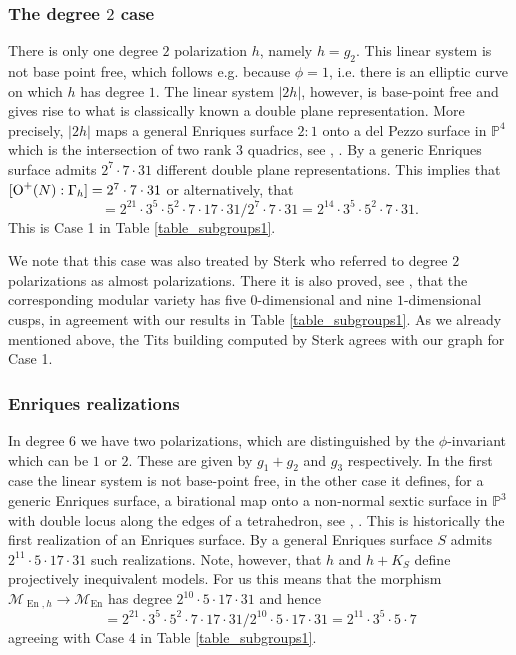 \documentclass[a4paper,11pt]{article}
\newcommand{\PP}{\mathbb P}
\newcommand{\cM}{\mathcal M}
\newcommand{\Orth}{\mathop{\null\mathrm {O}}\nolimits}
\newcommand{\En}{\mathop{\mathrm {En}}\nolimits}
\begin{document}
\subsubsection{The degree $2$ case}
There is only one degree $2$ polarization $h$, namely $h = g_2$. This linear system is not base point free,
which follows e.g. because $\phi=1$, i.e. there is an elliptic curve on which $h$ has degree $1$. The linear system $|2h|$, however, is base-point free
and gives rise to what is classically known a double plane representation. More precisely, $|2h|$ maps a general
Enriques surface $2:1$ onto a del Pezzo surface in $\PP^4$ which is the intersection of two rank $3$ quadrics, see \cite[Section 3.3]{BaPe}, \cite[Section 3.5]{CDL}. By
\cite[Theorem 3.9]{BaPe} a generic Enriques surface admits  $2^7\cdot 7 \cdot 31$ different double plane representations. This implies that $[\Orth^+(N):\Gamma_h]=2^7\cdot 7 \cdot 31$ or alternatively,
that
\begin{equation*}
[\Gamma_h: \tilde\Orth^+(N)]= 2^{21} \cdot 3^5 \cdot 5^2 \cdot 7 \cdot 17 \cdot 31/ 2^7 \cdot 7 \cdot 31= 2^{14} \cdot 3^5 \cdot 5^2 \cdot 7 \cdot 31.
\end{equation*}
This is Case 1 in Table \ref{table_subgroups1}.

We note that this case was also treated by Sterk \cite{Ste} who referred to degree $2$ polarizations as almost polarizations. There it is  also
proved, see \cite[Section 4.4]{Ste}, that the corresponding modular variety has five $0$-dimensional and nine $1$-dimensional cusps, in
agreement with our results in Table \ref{table_subgroups1}. As we already mentioned above, the Tits building computed by Sterk \cite[Fig 14]{Ste} agrees with our graph for Case 1.

\subsubsection{Enriques realizations}

In degree $6$ we have two polarizations, which are distinguished by the $\phi$-invariant which can be $1$ or $2$. These are given by $g_1 + g_2$ and $g_3$ respectively.
In the first case the linear system is not base-point free, in the other case it defines, for a generic Enriques surface, a birational map onto a non-normal sextic surface
in $\PP^3$ with double locus along the edges of a tetrahedron, see \cite[Section 3.1]{BaPe}, \cite[Section 3.5]{CDL}. This is historically the first realization of an Enriques surface.
By \cite[Theorem 3.10]{BaPe} a general Enriques surface $S$
admits $2^{11} \cdot 5 \cdot 17 \cdot 31$ such realizations. Note, however, that $h$ and $h+K_S$ define projectively inequivalent models. For us this means that the morphism
$\cM_{\En,h} \to {\cM}_{\En}$ has degree $2^{10} \cdot 5 \cdot 17 \cdot 31$ and hence
\begin{equation*}
[\Gamma_h: \tilde\Orth^+(N)]= 2^{21} \cdot 3^5 \cdot 5^2 \cdot 7 \cdot 17 \cdot 31 / 2^{10} \cdot 5 \cdot 17 \cdot 31= 2^{11} \cdot 3^5 \cdot 5 \cdot 7
\end{equation*}
agreeing with Case 4 in Table \ref{table_subgroups1}.
\end{document}
